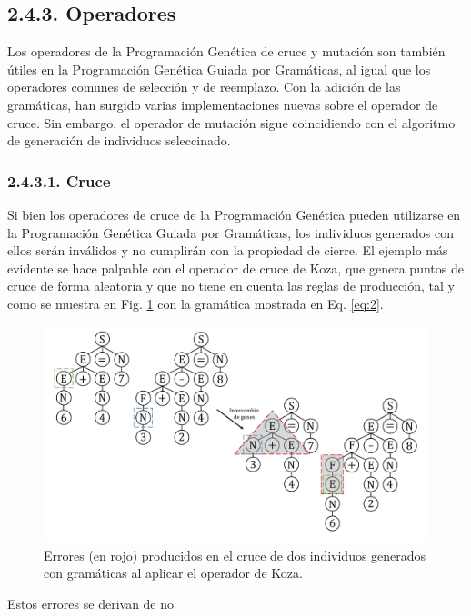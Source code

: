 \documentclass[spanish,a4paper,12pt,twoside]{report}
\begin{document}
    \subsection*{\large 2.4.3. Operadores}
    Los operadores de la Programación Genética de cruce y mutación son también útiles en la Programación Genética Guiada por Gramáticas, al igual que los operadores comunes de selección y de reemplazo. Con la adición de las gramáticas, han surgido varias implementaciones nuevas sobre el operador de cruce. Sin embargo, el operador de mutación sigue coincidiendo con el algoritmo de generación de individuos seleccinado.
    
      \subsubsection*{\normalsize 2.4.3.1. Cruce}
      Si bien los operadores de cruce de la Programación Genética pueden utilizarse en la Programación Genética Guiada por Gramáticas, los individuos generados con ellos serán inválidos y no cumplirán con la propiedad de cierre. El ejemplo más evidente se hace palpable con el operador de cruce de Koza, que genera puntos de cruce de forma aleatoria y que no tiene en cuenta las reglas de producción, tal y como se muestra en Fig. \ref{fig:7} con la gramática mostrada en Eq. \ref{eq:2}. \par
      \begin{figure}[H]
        \centering
        \includegraphics[width = 1\textwidth]{resources/Fig7.pdf}
        \caption{Errores (en rojo) producidos en el cruce de dos individuos generados con gramáticas al aplicar el operador de Koza.}
        \label{fig:7}
      \end{figure} \par
      Estos errores se derivan de no 
  
\end{document}
